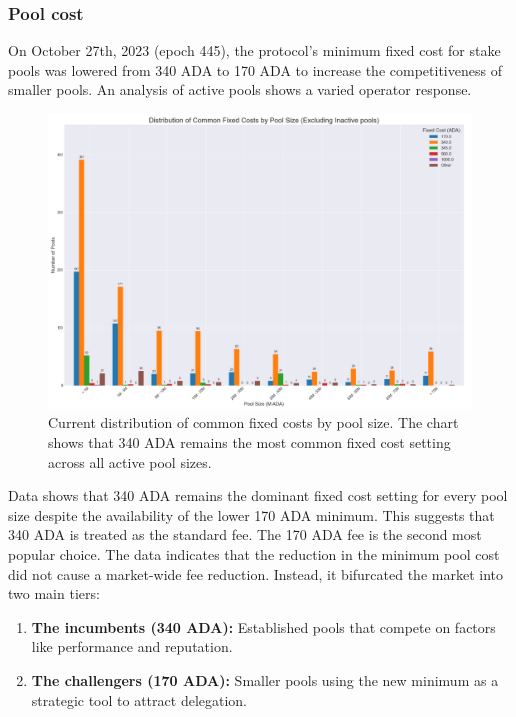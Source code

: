 \documentclass[11pt, letterpaper]{article}
\begin{document}
\subsubsection{Pool cost}

On October 27th, 2023 (epoch 445), the protocol's minimum fixed cost for stake
pools was lowered from 340 ADA to 170 ADA to increase the competitiveness of
smaller pools. An analysis of active pools shows a varied operator response.

\begin{figure}[H]
	\centering
	\includegraphics[width=\textwidth]{img/pool-cost-distr.png}
	\caption{Current distribution of common fixed costs by pool size. The chart shows that 340 ADA
		remains the most common fixed cost setting across all active pool sizes.}
	\label{fig:pool-cost}
\end{figure}

Data shows that 340 ADA remains the dominant fixed cost setting for every pool size despite the
availability of the lower 170 ADA minimum. This suggests that 340 ADA is
treated as the standard fee. The 170 ADA fee is the second most
popular choice. The data indicates that the reduction in the minimum pool
cost did not cause a market-wide fee reduction. Instead, it bifurcated the
market into two main tiers:

\begin{enumerate}
	\item \textbf{The incumbents (340 ADA):} Established pools that compete on factors like performance and
	      reputation.
	\item \textbf{The challengers (170 ADA):} Smaller pools using the new minimum as a strategic tool to
	      attract delegation.
\end{enumerate}
\end{document}
